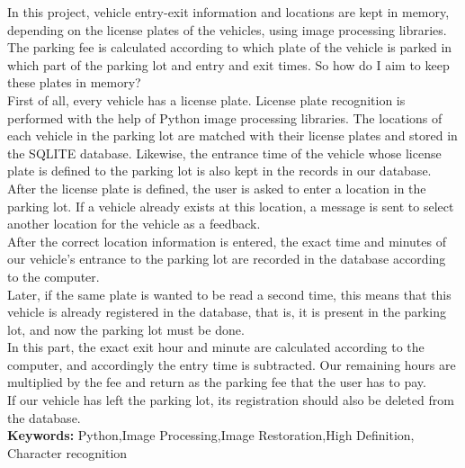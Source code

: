 In this project, vehicle entry-exit information and locations are kept in memory, depending on the license plates of the vehicles, using image processing libraries. The parking fee is calculated according to which plate of the vehicle is parked in which part of the parking lot and entry and exit times.
So how do I aim to keep these plates in memory? \\
First of all, every vehicle has a license plate. License plate recognition is performed with the help of Python image processing libraries. The locations of each vehicle in the parking lot are matched with their license plates and stored in the SQLITE database. Likewise, the entrance time of the vehicle whose license plate is defined to the parking lot is also kept in the records in our database.
After the license plate is defined, the user is asked to enter a location in the parking lot. If a vehicle already exists at this location, a message is sent to select another location for the vehicle as a feedback. \\
After the correct location information is entered, the exact time and minutes of our vehicle's entrance to the parking lot are recorded in the database according to the computer. \\
Later, if the same plate is wanted to be read a second time, this means that this vehicle is already registered in the database, that is, it is present in the parking lot, and now the parking lot must be done.\\
In this part, the exact exit hour and minute are calculated according to the computer, and accordingly the entry time is subtracted. Our remaining hours are multiplied by the fee and return as the parking fee that the user has to pay. \\
If our vehicle has left the parking lot, its registration should also be deleted from the database. \\

\textbf{Keywords:} Python,Image Processing,Image Restoration,High Definition, Character recognition